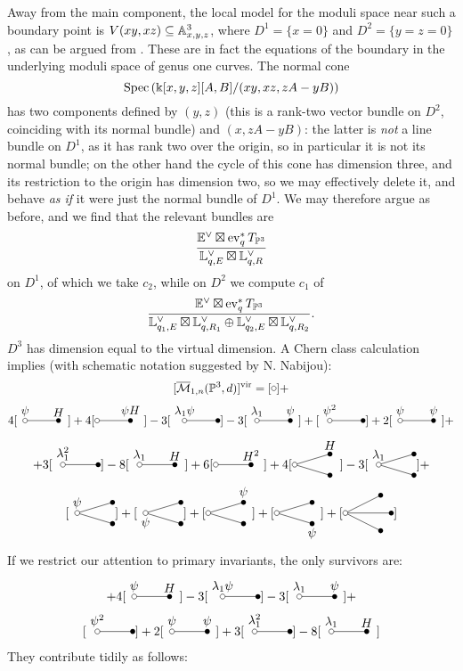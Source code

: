 Away from the main component, the local model for the moduli space near such a boundary point is $V(xy,xz)\subseteq\mathbb{A}^3_{x,y,z}$, where $D^1=\{x=0\}$ and $D^2=\{y=z=0\}$, as can be argued from \cite[\S 5.2]{HL}. These are in fact the equations of the boundary in the underlying moduli space of genus one curves. The normal cone \[\operatorname{Spec}\left(\Bbbk[x,y,z][A,B]/(xy,xz,zA-yB)\right)\] has two components defined by $(y,z)$ (this is a rank-two vector bundle on $D^2$, coinciding with its normal bundle) and $(x,zA-yB)$: the latter is \emph{not} a line bundle on $D^1$, as it has rank two over the origin, so in particular it is not its normal bundle; on the other hand the cycle of this cone has dimension three, and its restriction to the origin has dimension two, so we may effectively delete it, and behave \emph{as if} it were just the normal bundle of $D^1$. We may therefore argue as before, and we find that the relevant bundles are \[\frac{\mathbb E^\vee\boxtimes \operatorname{ev}_q^*T_{\mathbb P^3}}{\mathbb L^\vee_{q,E}\boxtimes \mathbb L^\vee_{q,R}}\]
on $D^1$, of which we take $c_2$, while on $D^2$ we compute $c_1$ of \[\frac{\mathbb E^\vee\boxtimes \operatorname{ev}_q^*T_{\mathbb P^3}}{\mathbb L^\vee_{q_1,E}\boxtimes \mathbb L^\vee_{q,R_1}\oplus\mathbb L^\vee_{q_2,E}\boxtimes \mathbb L^\vee_{q,R_2}}.\]
$D^3$ has dimension equal to the virtual dimension. A Chern class calculation implies (with schematic notation suggested by N. Nabijou):
\begin{multline*}
 \virt{\M{1}{n}{\PP^3}{d}}=[\reduced]+ \\
 4[\Dunouno]+4[\Dunodue]-3[\Dunotre]-3[\Dunoquat]+[\Dunocin]+2[\Dunosei]+
\end{multline*}
\begin{multline*}
 [\Dunoset]+3[\Dunoott]-8[\Dunonov]+6[\Dunodiec]+4[\Ddueuno]-3[\Dduedue]+\\
 [\Dduetre]+[\Dduequat]+[\Dduecin]+[\Dduesei]+[\Dtre]
\end{multline*}
If we restrict our attention to primary invariants, the only survivors are:
\begin{multline*}
 [\reduced]+ 4[\Dunouno]-3[\Dunotre]-3[\Dunoquat]+\\
 [\Dunocin]+2[\Dunosei]+3[\Dunoott]-8[\Dunonov]
\end{multline*}
They contribute tidily as follows:
